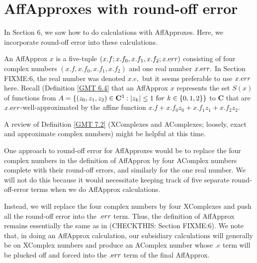 \chapter{AffApproxes with round-off error}
 
In Section 6, we saw how to do calculations with AffApproxes.  Here, we incorporate round-off error into
these calculations.  

\begin{conventions}\label{GMT 8,1}
An AffApprox $x$ is a five-tuple
$(x.f; x.f_0,x.f_1,x.f_2; x.{\textrm err})$
consisting of four complex numbers $(x.f, x.f_0,x.f_1, x.f_2)$ and one real number $x.{\textrm err}.$  In Section FIXME:6, the
	real number was denoted $x.e,$ but it seems preferable to use $x.{\textrm err}$ here.  Recall (Definition \ref{GMT 6.4}
that an AffApprox $x$ represents the set $S(x)$ of functions from $A = \{(z_0,z_1,z_2) \in {\mathbf C}^3 : |z_k| \le 1 \
{\textrm for} \ k \in \{0,1,2\}\}$ to ${\mathbf C}$ that are $x.{\textrm err}$-well-approximated by the affine function
$x.f + x.f_0 z_0 + x.f_1 z_1 + x.f_2 z_2.$
\end{conventions}

\begin{remarks} \label{GMT 8.2}
A review of Definition \ref{GMT 7.2} (XComplexes and AComplexes; loosely, exact and approximate complex numbers) might be helpful at this time.

One approach to round-off error for AffApproxes would be to replace the four complex numbers in the definition of AffApprox by four AComplex numbers complete with their round-off errors, and similarly for the one real number.  We will not do this because it would necessitate keeping track of five separate round-off-error terms when we do AffApprox calculations.

Instead, we will 
replace the four complex numbers by four XComplexes and push all the round-off error into the $.{\textrm err}$ term.  
Thus, the definition of AffApprox remains 
essentially the same as in
	(CHECKTHIS: Section FIXME:6).  %
We note that, in doing an AffApprox calculation, our subsidiary calculations will generally be on XComplex numbers and produce an AComplex number whose $.e$ term will be plucked off and forced into the $.{\textrm err}$ term of the final AffApprox.\end{remarks}

